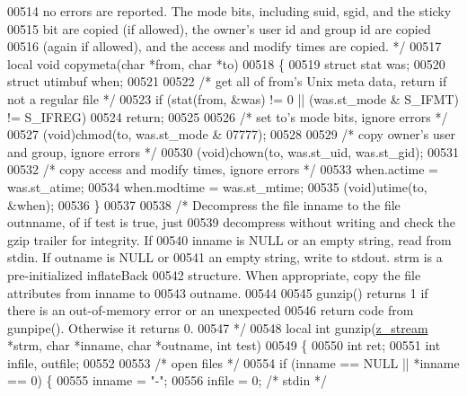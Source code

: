 \begin{DoxyCode}
00514 \textcolor{comment}{   no errors are reported.  The mode bits, including suid, sgid, and the sticky}
00515 \textcolor{comment}{   bit are copied (if allowed), the owner's user id and group id are copied}
00516 \textcolor{comment}{   (again if allowed), and the access and modify times are copied. */}
00517 local \textcolor{keywordtype}{void} copymeta(\textcolor{keywordtype}{char} *from, \textcolor{keywordtype}{char} *to)
00518 \{
00519     \textcolor{keyword}{struct }stat was;
00520     \textcolor{keyword}{struct }utimbuf when;
00521 
00522     \textcolor{comment}{/* get all of from's Unix meta data, return if not a regular file */}
00523     \textcolor{keywordflow}{if} (stat(from, &was) != 0 || (was.st\_mode & S\_IFMT) != S\_IFREG)
00524         \textcolor{keywordflow}{return};
00525 
00526     \textcolor{comment}{/* set to's mode bits, ignore errors */}
00527     (void)chmod(to, was.st\_mode & 07777);
00528 
00529     \textcolor{comment}{/* copy owner's user and group, ignore errors */}
00530     (void)chown(to, was.st\_uid, was.st\_gid);
00531 
00532     \textcolor{comment}{/* copy access and modify times, ignore errors */}
00533     when.actime = was.st\_atime;
00534     when.modtime = was.st\_mtime;
00535     (void)utime(to, &when);
00536 \}
00537 
00538 \textcolor{comment}{/* Decompress the file inname to the file outnname, of if test is true, just}
00539 \textcolor{comment}{   decompress without writing and check the gzip trailer for integrity.  If}
00540 \textcolor{comment}{   inname is NULL or an empty string, read from stdin.  If outname is NULL or}
00541 \textcolor{comment}{   an empty string, write to stdout.  strm is a pre-initialized inflateBack}
00542 \textcolor{comment}{   structure.  When appropriate, copy the file attributes from inname to}
00543 \textcolor{comment}{   outname.}
00544 \textcolor{comment}{}
00545 \textcolor{comment}{   gunzip() returns 1 if there is an out-of-memory error or an unexpected}
00546 \textcolor{comment}{   return code from gunpipe().  Otherwise it returns 0.}
00547 \textcolor{comment}{ */}
00548 local \textcolor{keywordtype}{int} gunzip(\hyperlink{structz__stream__s}{z\_stream} *strm, \textcolor{keywordtype}{char} *inname, \textcolor{keywordtype}{char} *outname, \textcolor{keywordtype}{int} test)
00549 \{
00550     \textcolor{keywordtype}{int} ret;
00551     \textcolor{keywordtype}{int} infile, outfile;
00552 
00553     \textcolor{comment}{/* open files */}
00554     \textcolor{keywordflow}{if} (inname == NULL || *inname == 0) \{
00555         inname = \textcolor{stringliteral}{"-"};
00556         infile = 0;     \textcolor{comment}{/* stdin */}

\end{DoxyCode}
